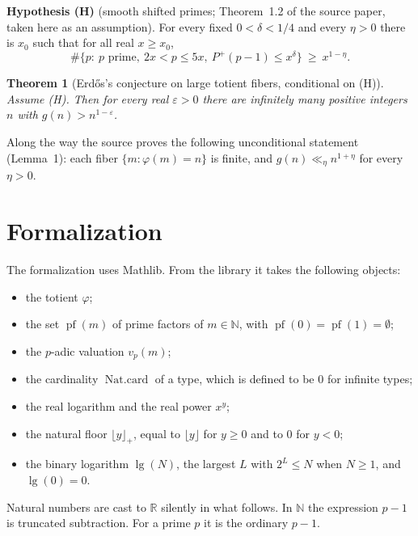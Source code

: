 \documentclass[11pt]{article}
\newtheorem{theorem}{Theorem}[section]
\theoremstyle{definition}
\theoremstyle{remark}
\newcommand{\N}{\mathbb{N}}
\newcommand{\R}{\mathbb{R}}
\newcommand{\nfl}[1]{\lfloor #1\rfloor_{+}}
\DeclareMathOperator{\lgt}{lg}
\DeclareMathOperator{\pf}{pf}
\begin{document}
\medskip\noindent\textbf{Hypothesis (H)} (smooth shifted primes; Theorem~1.2 of the source paper, taken here as an assumption).
For every fixed $0<\delta<1/4$ and every $\eta>0$ there is $x_0$ such that for all real $x\ge x_0$,
\[
 \#\{p:\ p\text{ prime},\ 2x<p\le 5x,\ P^+(p-1)\le x^{\delta}\}\ \ge\ x^{1-\eta}.
\]

\begin{theorem}[Erd\H{o}s's conjecture on large totient fibers, conditional on (H)]
Assume (H). Then for every real $\varepsilon>0$ there are infinitely many positive integers $n$ with $g(n)>n^{1-\varepsilon}$.
\end{theorem}

Along the way the source proves the following unconditional statement (Lemma~1): each fiber $\{m:\varphi(m)=n\}$ is finite, and $g(n)\ll_\eta n^{1+\eta}$ for every $\eta>0$.

\section{Formalization}

The formalization uses Mathlib. From the library it takes the following objects:
\begin{itemize}
\item the totient $\varphi$;
\item the set $\pf(m)$ of prime factors of $m\in\N$, with $\pf(0)=\pf(1)=\emptyset$;
\item the $p$-adic valuation $v_p(m)$;
\item the cardinality $\operatorname{Nat.card}$ of a type, which is defined to be $0$ for infinite types;
\item the real logarithm and the real power $x^y$;
\item the natural floor $\nfl{y}$, equal to $\lfloor y\rfloor$ for $y\ge0$ and to $0$ for $y<0$;
\item the binary logarithm $\lgt(N)$, the largest $L$ with $2^L\le N$ when $N\ge1$, and $\lgt(0)=0$.
\end{itemize}
Natural numbers are cast to $\R$ silently in what follows. In $\N$ the expression $p-1$ is truncated subtraction. For a prime $p$ it is the ordinary $p-1$.
\end{document}
